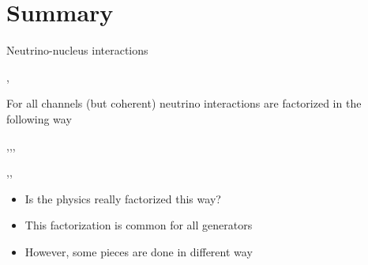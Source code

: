 \section{Summary}

\begin{wideslide}[toc=Neutrino interactions]{Neutrino-nucleus interactions}
\null\vfill

  \sep

  For all channels (but coherent) neutrino interactions are factorized in the following way
  
  \sep\sep\sep
  
  \centering
  
  \sep\sep
  
  \begin{itemize}
   \item Is the physics really factorized this way?
   \item This factorization is common for all generators
   \item However, some pieces are done in different way
  \end{itemize}
  
\vfill\null
\end{wideslide}

